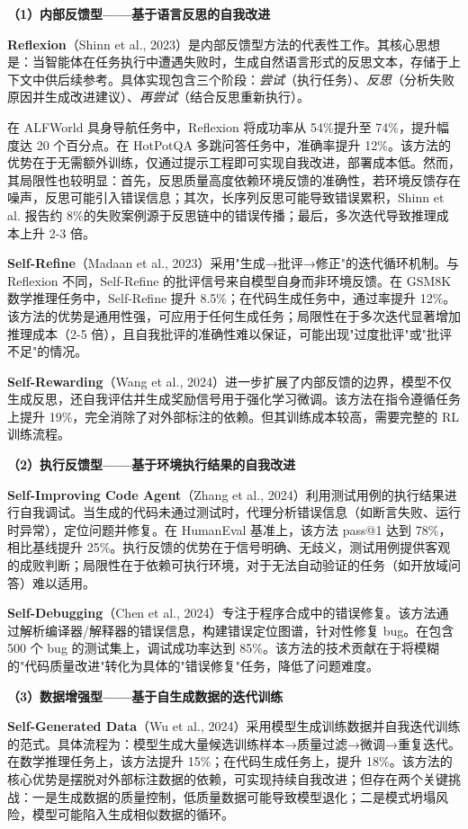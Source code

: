 \documentclass[12pt,a4paper]{article}
\begin{document}
\textbf{（1）内部反馈型——基于语言反思的自我改进}

\textbf{Reflexion}（Shinn et al., 2023）是内部反馈型方法的代表性工作。其核心思想是：当智能体在任务执行中遭遇失败时，生成自然语言形式的反思文本，存储于上下文中供后续参考。具体实现包含三个阶段：\textit{尝试}（执行任务）、\textit{反思}（分析失败原因并生成改进建议）、\textit{再尝试}（结合反思重新执行）。

在 ALFWorld 具身导航任务中，Reflexion 将成功率从 54\%提升至 74\%，提升幅度达 20 个百分点。在 HotPotQA 多跳问答任务中，准确率提升 12\%。该方法的优势在于无需额外训练，仅通过提示工程即可实现自我改进，部署成本低。然而，其局限性也较明显：首先，反思质量高度依赖环境反馈的准确性，若环境反馈存在噪声，反思可能引入错误信息；其次，长序列反思可能导致错误累积，Shinn et al. 报告约 8\%的失败案例源于反思链中的错误传播；最后，多次迭代导致推理成本上升 2-3 倍。

\textbf{Self-Refine}（Madaan et al., 2023）采用"生成→批评→修正"的迭代循环机制。与 Reflexion 不同，Self-Refine 的批评信号来自模型自身而非环境反馈。在 GSM8K 数学推理任务中，Self-Refine 提升 8.5\%；在代码生成任务中，通过率提升 12\%。该方法的优势是通用性强，可应用于任何生成任务；局限性在于多次迭代显著增加推理成本（2-5 倍），且自我批评的准确性难以保证，可能出现"过度批评"或"批评不足"的情况。

\textbf{Self-Rewarding}（Wang et al., 2024）进一步扩展了内部反馈的边界，模型不仅生成反思，还自我评估并生成奖励信号用于强化学习微调。该方法在指令遵循任务上提升 19\%，完全消除了对外部标注的依赖。但其训练成本较高，需要完整的 RL 训练流程。

\textbf{（2）执行反馈型——基于环境执行结果的自我改进}

\textbf{Self-Improving Code Agent}（Zhang et al., 2024）利用测试用例的执行结果进行自我调试。当生成的代码未通过测试时，代理分析错误信息（如断言失败、运行时异常），定位问题并修复。在 HumanEval 基准上，该方法 pass@1 达到 78\%，相比基线提升 25\%。执行反馈的优势在于信号明确、无歧义，测试用例提供客观的成败判断；局限性在于依赖可执行环境，对于无法自动验证的任务（如开放域问答）难以适用。

\textbf{Self-Debugging}（Chen et al., 2024）专注于程序合成中的错误修复。该方法通过解析编译器/解释器的错误信息，构建错误定位图谱，针对性修复 bug。在包含 500 个 bug 的测试集上，调试成功率达到 85\%。该方法的技术贡献在于将模糊的"代码质量改进"转化为具体的"错误修复"任务，降低了问题难度。

\textbf{（3）数据增强型——基于自生成数据的迭代训练}

\textbf{Self-Generated Data}（Wu et al., 2024）采用模型生成训练数据并自我迭代训练的范式。具体流程为：模型生成大量候选训练样本→质量过滤→微调→重复迭代。在数学推理任务上，该方法提升 15\%；在代码生成任务上，提升 18\%。该方法的核心优势是摆脱对外部标注数据的依赖，可实现持续自我改进；但存在两个关键挑战：一是生成数据的质量控制，低质量数据可能导致模型退化；二是模式坍塌风险，模型可能陷入生成相似数据的循环。
\end{document}
